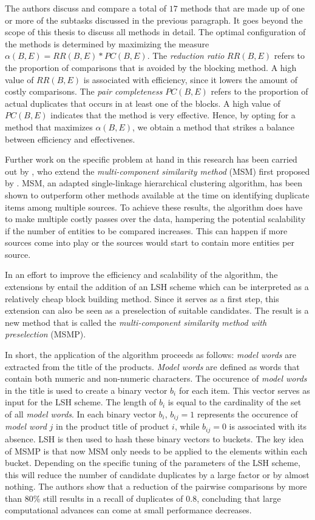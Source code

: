 The authors discuss and compare a total of $17$ methods that are made up of one or more of the subtasks discussed in the previous paragraph. It goes beyond the scope of this thesis to discuss all methods in detail. The optimal configuration of the methods is determined by maximizing the measure $\alpha(B,E) = RR(B,E) * PC(B,E)$. The \textit{reduction ratio} $RR(B,E)$ refers to the proportion of comparisons that is avoided by the blocking method. A high value of $RR(B,E)$ is associated with efficiency, since it lowers the amount of costly comparisons. The \textit{pair completeness} $PC(B,E)$ refers to the proportion of actual duplicates that occurs in at least one of the blocks. A high value of $PC(B,E)$ indicates that the method is very effective. Hence, by opting for a method that maximizes $\alpha(B,E)$, we obtain a method that strikes a balance between efficiency and effectivenes.

Further work on the specific problem at hand in this research has been carried out by \cite{DamGKNVF16}, who extend the \textit{multi-component similarity method} (MSM) first proposed by \cite{BezuBRVVF15}. MSM, an adapted single-linkage hierarchical clustering algorithm, has been shown to outperform other methods available at the time on identifying duplicate items among multiple sources. To achieve these results, the algorithm does have to make multiple costly passes over the data, hampering the potential scalability if the number of entities to be compared increases. This can happen if more sources come into play or the sources would start to contain more entities per source.

In an effort to improve the efficiency and scalability of the algorithm, the extensions by \cite{DamGKNVF16} entail the addition of an LSH scheme which can be interpreted as a relatively cheap block building method. Since it serves as a first step, this extension can also be seen as a preselection of suitable candidates. The result is a new method that is called the \textit{multi-component similarity method with preselection} (MSMP). 

In short, the application of the algorithm proceeds as follows: \textit{model words} are extracted from the title of the products. \textit{Model words} are defined as words that contain both numeric and non-numeric characters. The occurence of \textit{model words} in the title is used to create a binary vector $b_i$ for each item. This vector serves as input for the LSH scheme. The length of $b_i$ is equal to the cardinality of the set of all \textit{model words}. In each binary vector $b_i$, $b_{ij}=1$ represents the occurence of \textit{model word} $j$ in the product title of product $i$, while $b_{ij}=0$ is associated with its absence. LSH is then used to hash these binary vectors to buckets. The key idea of MSMP is that now MSM only needs to be applied to the elements within each bucket.  Depending on the specific tuning of the parameters of the LSH scheme, this will reduce the number of candidate duplicates by a large factor or by almost nothing. The authors show that a reduction of the pairwise comparisons by more than 80\% still results in a recall of duplicates of $0.8$, concluding that large computational advances can come at small performance decreases. 

